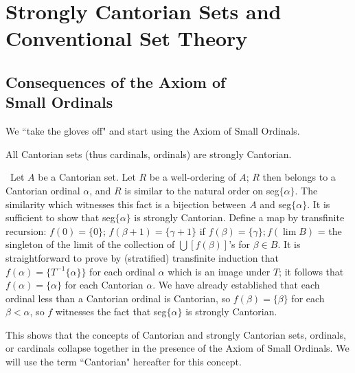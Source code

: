 \chapter[Strongly Cantorian Sets]{Strongly Cantorian Sets and\\ Conventional
Set Theory}


\section[Consequences of Small Ordinals]{Consequences of the Axiom of\\ Small
Ordinals}

We ``take the gloves off" and start using the Axiom of Small
Ordinals.

\begin{thm}
 All Cantorian sets (thus cardinals, ordinals) are strongly Cantorian.
\end{thm}

\preuve\ Let $A$ be a Cantorian set.  Let $R$ be a
well-ordering of $A$; $R$ then belongs to a Cantorian
ordinal $\alpha$, and $R$ is similar
to the natural order on seg$\{\alpha\}$.  The similarity which
witnesses this fact is a bijection between $A$ and seg$\{\alpha\}$.
It is sufficient to show that seg$\{\alpha\}$ is strongly Cantorian.
Define a map by transfinite recursion: $f(0) =
\{0\}$; $f(\beta+1) = \{\gamma+1\}$ if $f(\beta) = \{\gamma\}; f(\lim B)$ = the
singleton of the limit of the collection of
$\bigcup[f(\beta)]$'s for $\beta \in B$.  It is straightforward to prove by
(stratified) transfinite 
induction that $f(\alpha) = \{T^{-1}\{\alpha\}\}$ for each ordinal
$\alpha$ which is an image under $T$; it follows that $f(\alpha) =
\{\alpha\}$ for each Cantorian $\alpha$.  We have already established
that each ordinal less than a Cantorian ordinal is Cantorian, so
$f(\beta) = \{\beta\}$ for each $\beta<\alpha$, so $f$ witnesses the
fact that seg$\{\alpha\}$ is strongly Cantorian.
\finpreuve

This shows that the concepts of Cantorian and strongly
Cantorian sets, ordinals, or cardinals collapse together in the presence of the Axiom of Small
Ordinals.  We will use the term 
``Cantorian" hereafter for this concept.

